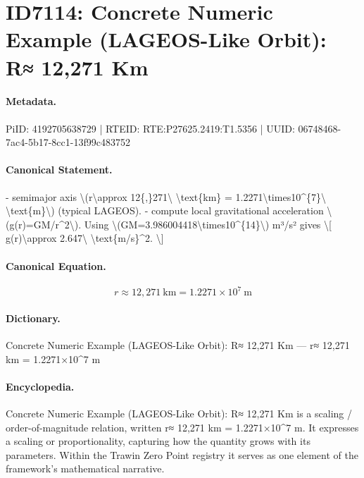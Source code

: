 \section*{ID7114: Concrete Numeric Example (LAGEOS-Like Orbit): R≈ 12,271 Km}
\paragraph{Metadata.}
PiID: 4192705638729 | RTEID: RTE:P27625.2419:T1.5356 | UUID: 06748468-7ac4-5b17-8cc1-13f99c483752

\paragraph{Canonical Statement.}
- semimajor axis \textbackslash{}(r\textbackslash{}approx 12\{,\}271\textbackslash{} \textbackslash{}text\{km\} = 1.2271\textbackslash{}times10\textasciicircum{}\{7\}\textbackslash{} \textbackslash{}text\{m\}\textbackslash{}) (typical LAGEOS). - compute local gravitational acceleration \textbackslash{}(g(r)=GM/r\textasciicircum{}2\textbackslash{}). Using \textbackslash{}(GM=3.986004418\textbackslash{}times10\textasciicircum{}\{14\}\textbackslash{}) m³/s² gives \textbackslash{}[ g(r)\textbackslash{}approx 2.647\textbackslash{} \textbackslash{}text\{m/s\}\textasciicircum{}2. \textbackslash{}]

\paragraph{Canonical Equation.}
\[
r\approx 12{,}271\ \text{km} = 1.2271\times10^{7}\ \text{m}
\]

\paragraph{Dictionary.}
Concrete Numeric Example (LAGEOS-Like Orbit): R≈ 12,271 Km — r≈ 12,271 km = 1.2271×10\textasciicircum{}7 m

\paragraph{Encyclopedia.}
Concrete Numeric Example (LAGEOS-Like Orbit): R≈ 12,271 Km is a scaling / order-of-magnitude relation, written r≈ 12,271 km = 1.2271×10\textasciicircum{}7 m. It expresses a scaling or proportionality, capturing how the quantity grows with its parameters. Within the Trawin Zero Point registry it serves as one element of the framework's mathematical narrative.
